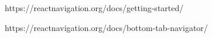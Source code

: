 https://reactnavigation.org/docs/getting-started/

https://reactnavigation.org/docs/bottom-tab-navigator/